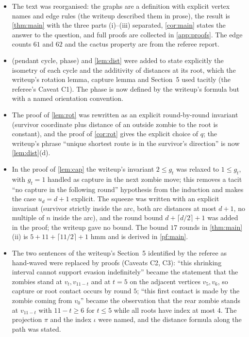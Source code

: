 \documentclass[11pt,a4paper]{article}
\theoremstyle{plain}
\theoremstyle{definition}
\theoremstyle{remark}
\providecommand{\tightlist}{\setlength{\itemsep}{0pt}\setlength{\parskip}{0pt}}
\newcommand{\proj}{\pi}
\newcommand{\idx}{\iota}
\begin{document}
\begin{itemize}\tightlist
\item The text was reorganised: the graphs are a definition with explicit vertex names and edge rules (the writeup described them in prose), the result is \cref{thm:main} with the three parts (i)--(iii) separated, \cref{cor:main} states the answer to the question, and full proofs are collected in \cref{app:proofs}. The edge counts $61$ and $62$ and the cactus property are from the referee report.
\item {} (pendant cycle, phase) and \cref{lem:dist} were added to state explicitly the isometry of each cycle and the additivity of distances at its root, which the writeup's rotation lemma, capture lemma and Section~5 used tacitly (the referee's Caveat C1). The phase is now defined by the writeup's formula but with a named orientation convention.
\item The proof of \cref{lem:rot} was rewritten as an explicit round-by-round invariant (survivor coordinate plus distance of an outside zombie to the root is constant), and the proof of \cref{cor:rot} gives the explicit choice of $q$; the writeup's phrase ``unique shortest route is in the survivor's direction'' is now \cref{lem:dist}(d).
\item In the proof of \cref{lem:cap} the writeup's invariant $2\le g_t$ was relaxed to $1\le g_t$, with $g_t=1$ handled as capture in the next zombie move; this removes a tacit ``no capture in the following round'' hypothesis from the induction and makes the case $u_d=d+1$ explicit. The squeeze was written with an explicit invariant (survivor strictly inside the arc, both arc distances at most $d+1$, no multiple of $n$ inside the arc), and the round bound $d+\lceil d/2\rceil+1$ was added in the proof; the writeup gave no bound. The bound $17$ rounds in \cref{thm:main}(ii) is $5+11+\lceil 11/2\rceil+1$ hmm and is derived in \cref{pf:main}.
\item The two sentences of the writeup's Section~5 identified by the referee as hand-waved were replaced by proofs (Caveats C2, C3): ``this shrinking interval cannot support evasion indefinitely'' became the statement that the zombies stand at $v_t,v_{11-t}$ and at $t=5$ on the adjacent vertices $v_5,v_6$, so capture or root contact occurs by round $5$; ``this first contact is made by the zombie coming from $v_0$'' became the observation that the rear zombie stands at $v_{11-t}$ with $11-t\ge6$ for $t\le5$ while all roots have index at most $4$. The projection $\proj$ and the index $\idx$ were named, and the distance formula along the path was stated.

\end{itemize}
\end{document}
